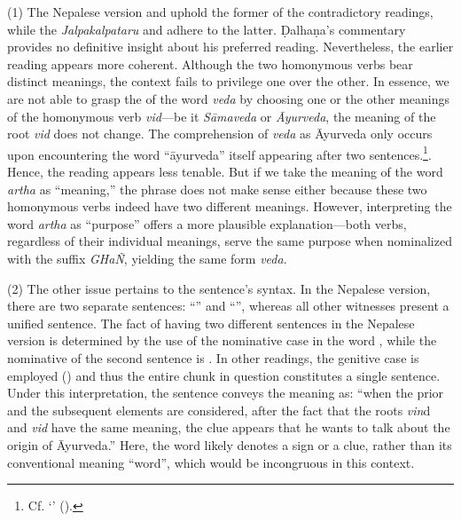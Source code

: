 (1) The Nepalese version and  uphold 
the former of the contradictory readings, 
while the \emph{Jalpakalpataru} and \Su{}{} adhere to the latter. 
Ḍalhaṇa's commentary provides no definitive insight about his preferred reading. 
Nevertheless, the earlier reading appears more coherent. 
Although the two homonymous verbs bear distinct meanings, 
the context fails to privilege one over the other. 
In essence, we are not able to grasp the  of the 
word \emph{veda} 
by choosing one or the other meanings of the homonymous verb \emph{vid}---be 
it \emph{Sāmaveda} or \emph{Āyurveda}, 
the meaning of the root \emph{vid} does not change. 
The comprehension of \emph{veda} as Āyurveda only occurs 
upon encountering the word “āyurveda” 
itself appearing after two sentences.\footnote{Cf. ‘’ 
	 ().}. 
Hence, the reading  appears less tenable. 
But if we take the meaning of the word \emph{artha} as “meaning,” 
the phrase  
does not make sense either because these two homonymous verbs indeed have 
two different meanings. 
However, interpreting the word \emph{artha} as “purpose” offers a more 
plausible explanation---both verbs, 
regardless of their individual meanings, 
serve the same purpose when nominalized with the suffix \emph{GHaÑ}, 
yielding the same form \emph{veda}. 

(2) The other issue pertains to the sentence’s syntax. 
In the Nepalese version, there are two separate sentences: 
“” 
and “”, 
whereas all other witnesses present a unified sentence. 
The fact of having two different sentences in the Nepalese version 
is determined by the use of the nominative case in the word , 
while the nominative of the second sentence is . 
In other readings, the genitive case is employed () 
and thus the entire chunk in question constitutes a single sentence. 
Under this interpretation, the sentence conveys the meaning as: 
“when the prior and the subsequent elements are considered, 
after the fact that the roots \emph{vin}d and \emph{vid} have the same 
meaning, 
the clue appears that he wants to talk about the origin of Āyurveda.” 
Here, the word  likely denotes a sign or a clue, 
rather than its conventional meaning “word”, 
which would be incongruous in this context.

